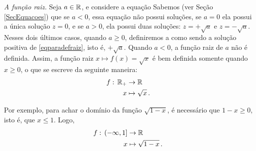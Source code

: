 \begin{ex}
\emph{A função raiz.} Seja $a\in \mathbb{R}$, e considere a equação
 Sabemos (ver Seção \ref{SecEquacoes}) que se $a<0$, essa equação não possui soluções, se
$a=0$ ela possui a única solução $z=0$, e se $a> 0$, ela possui duas soluções:
$z=+\sqrt{a}$ e $z=-\sqrt{a}$. Nesses dois últimos casos, quando $a\geq 0$, definiremos 
a  como sendo a solução positiva de \eqref{eqparadefraiz}, isto
é, $+\sqrt{a}$.
 Quando $a<0$, a função raiz de $a$ não é definida. Assim, a função raiz $x\mapsto
f(x)=\sqrt{x}$
é bem definida somente quando $x\geq 0$, o que se escreve da seguinte maneira:
\begin{align*}
 f:\,\mathbb{R}_+&\to \mathbb{R}\\
x&\mapsto \sqrt{x}\,.
\end{align*}
\end{ex}

Por exemplo, para achar o domínio da função $\sqrt{1-x}$, é necessário que $1-x\geq 0$, 
isto é, que $x\leq 1$. Logo,
\begin{align*}
 f:\,(-\infty,1]&\to \mathbb{R}\\
x&\mapsto \sqrt{1-x}\,.
\end{align*}

